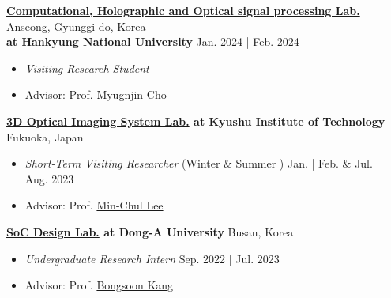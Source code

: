 \documentclass[a4paper,9pt]{extarticle}
\begin{document}
\noindent
\textbf{\href{https://3cholab.wordpress.com/정보/}{Computational, Holographic and Optical signal processing Lab.}} \hfill Anseong, Gyunggi-do, Korea\\ %
\textbf{at Hankyung National University} \hfill Jan. 2024 | Feb. 2024
\begin{itemize}
    \item \textit{Visiting Research Student} 
    \item Advisor: Prof. \href{https://orcid.org/0000-0003-2896-770X}{Myugnjin Cho}
\end{itemize}

\noindent
\textbf{\href{https://leelab.csn.kyutech.ac.jp}{3D Optical Imaging System Lab.} at Kyushu Institute of Technology} \hfill Fukuoka, Japan
\begin{itemize}
    \item \textit{Short-Term Visiting Researcher} (Winter \& Summer ) \hfill Jan. |  Feb. \& Jul.  | Aug. 2023
    \item Advisor: Prof. \href{https://orcid.org/0000-0001-8469-0288}{Min-Chul Lee}
\end{itemize}

\noindent
\textbf{\href{https://soc.donga.ac.kr/soc/Main.do}{SoC Design Lab.} at Dong-A University} \hfill Busan, Korea %
\begin{itemize}
    \item \textit{Undergraduate Research Intern} \hfill Sep. 2022 | Jul. 2023 
    \item Advisor: Prof. \href{https://orcid.org/0000-0001-6716-5799}{Bongsoon Kang}
\end{itemize}
\end{document}
